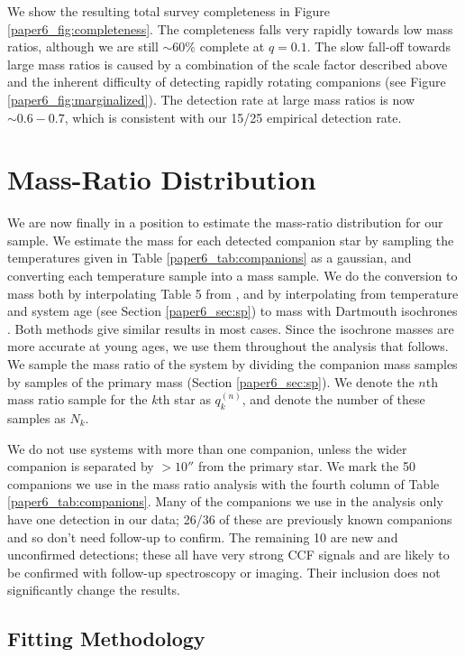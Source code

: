 We show the resulting total survey completeness in Figure \ref{paper6_fig:completeness}. The completeness falls very rapidly towards low mass ratios, although we are still $\sim 60\%$ complete at $q = 0.1$. The slow fall-off towards large mass ratios is caused by a combination of the scale factor described above and the inherent difficulty of detecting rapidly rotating companions (see Figure \ref{paper6_fig:marginalized}). The detection rate at large mass ratios is now $\sim 0.6-0.7$, which is consistent with our 15/25 empirical detection rate. 

\section{Mass-Ratio Distribution}
\label{paper6_sec:mrd}

We are now finally in a position to estimate the mass-ratio distribution for our sample. We estimate the mass for each detected companion star by sampling the temperatures given in Table \ref{paper6_tab:companions} as a gaussian, and converting each temperature sample into a mass sample. We do the conversion to mass both by interpolating Table 5 from \citet{Pecaut2013}, and by interpolating from temperature and system age (see Section \ref{paper6_sec:sp}) to mass with Dartmouth isochrones \citep{Dotter2008}. Both methods give similar results in most cases. Since the isochrone masses are more accurate at young ages, we use them throughout the analysis that follows. We sample the mass ratio of the system by dividing the companion mass samples by samples of the primary mass (Section \ref{paper6_sec:sp}). We denote the $n$th mass ratio sample for the $k$th star as $q_k^{(n)}$, and denote the number of these samples as $N_k$.

We do not use systems with more than one companion, unless the wider companion is separated by $ > 10''$ from the primary star. We mark the 50 companions we use in the mass ratio analysis with the fourth column of Table \ref{paper6_tab:companions}. Many of the companions we use in the analysis only have one detection in our data; 26/36 of these are previously known companions and so don't need follow-up to confirm. The remaining 10 are new and unconfirmed detections; these all have very strong CCF signals and are likely to be confirmed with follow-up spectroscopy or imaging. Their inclusion does not significantly change the results.


\subsection{Fitting  Methodology}

